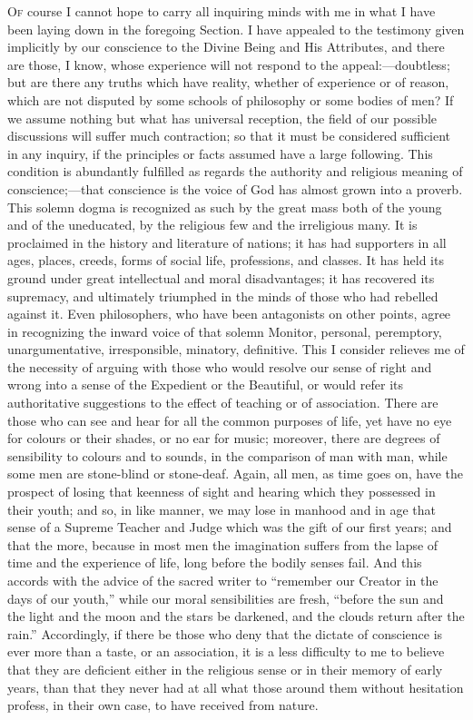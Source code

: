 O\textsc{f} course I cannot hope to carry all inquiring minds with me
in what I have been laying down in the foregoing Section. I have
appealed to the testimony given implicitly by our conscience to the
Divine Being and His Attributes, and there are those, I know, whose
experience will not respond to the appeal:—doubtless; but are there
any truths which have reality, whether of experience or of reason,
which are not disputed by some schools of philosophy or some bodies of
men? If we assume nothing but what has universal reception, the field
of our possible discussions will suffer much contraction; so that it
must be considered sufficient in any inquiry, if the principles or
facts assumed have a large following. This condition is abundantly
fulfilled as regards the authority and religious meaning of
conscience;—that conscience is the voice of God has almost grown
into a proverb. This solemn dogma is recognized as such by the great
mass both of the young and of the uneducated, by the religious few and
the irreligious many. It is proclaimed in the history and literature
of nations; it has had supporters in all ages, places, creeds, forms
of social life, professions, and classes. It has held its ground
under great intellectual and moral disadvantages; it has recovered its
supremacy, and ultimately triumphed in the minds of those who had
rebelled against it. Even philosophers, who have been antagonists on
other points, agree in recognizing the inward voice of that solemn
Monitor, personal, peremptory, unargumentative, irresponsible,
minatory, definitive. This I consider relieves me of the necessity of
arguing with those who would resolve our sense of right and wrong into
a sense of the Expedient or the Beautiful, or would refer its
authoritative suggestions to the effect of teaching or of association.
There are those who can see and hear for all the common purposes of
life, yet have no eye for colours or their shades, or no ear for
music; moreover, there are degrees of sensibility to colours and to
sounds, in the comparison of man with man, while some men are
stone-blind or stone-deaf. Again, all men, as time goes on, have the
prospect of losing that keenness of sight and hearing which they
possessed in their youth; and so, in like manner, we may lose in
manhood and in age that sense of a Supreme Teacher and Judge which was
the gift of our first years; and that the more, because in most men
the imagination suffers from the lapse of time and the experience of
life, long before the bodily senses fail. And this accords with the
advice of the sacred writer to ``remember our Creator in the days
of our youth,'' while our moral sensibilities are fresh,
``before the sun and the light and the moon and the stars be
darkened, and the clouds return after the rain.'' Accordingly, if
there be those who deny that the dictate of conscience is ever
more than a taste, or an association, it is a less difficulty to me to
believe that they are deficient either in the religious sense or in
their memory of early years, than that they never had at all what
those around them without hesitation profess, in their own case, to
have received from nature.

